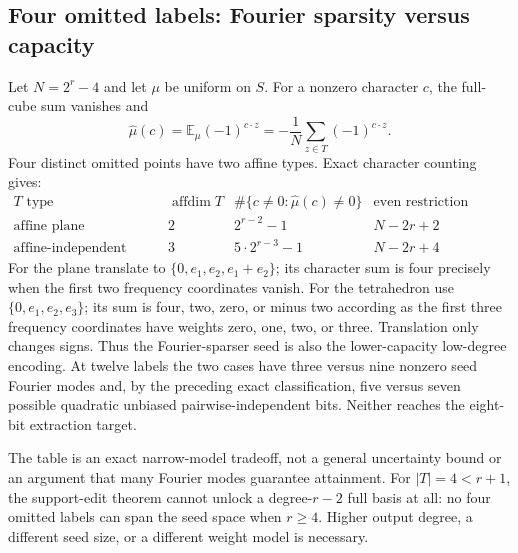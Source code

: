 \subsection{Four omitted labels: Fourier sparsity versus capacity}
Let $N=2^r-4$ and let $\mu$ be uniform on $S$. For a nonzero character
$c$, the full-cube sum vanishes and
\[
 \widehat\mu(c)=\mathbb E_\mu(-1)^{c\cdot z}
 =-\frac1N\sum_{z\in T}(-1)^{c\cdot z}.
\]
Four distinct omitted points have two affine types. Exact character
counting gives:
\[
 \begin{array}{c|c|c|c}
 T\text{ type}&\operatorname{affdim}T&
 \#\{c\ne0:\widehat\mu(c)\ne0\}&
 \text{even restriction bilinear rank}\\\hline
 \text{affine plane}&2&2^{r-2}-1&N-2r+2\\
 \text{affine-independent tetrahedron}&3&5\cdot2^{r-3}-1&N-2r+4
 \end{array}
\]
For the plane translate to $\{0,e_1,e_2,e_1+e_2\}$; its character sum
is four precisely when the first two frequency coordinates vanish.
For the tetrahedron use $\{0,e_1,e_2,e_3\}$; its sum is four, two,
zero, or minus two according as the first three frequency coordinates
have weights zero, one, two, or three. Translation only changes signs.
Thus the Fourier-sparser seed is also the lower-capacity low-degree
encoding. At twelve labels the two cases have three versus nine nonzero
seed Fourier modes and, by the preceding exact classification, five
versus seven possible quadratic unbiased pairwise-independent bits.
Neither reaches the eight-bit extraction target.

The table is an exact narrow-model tradeoff, not a general uncertainty
bound or an argument that many Fourier modes guarantee attainment.
For $|T|=4<r+1$, the support-edit theorem cannot unlock a degree-$r-2$
full basis at all: no four omitted labels can span the seed space when
$r\ge4$. Higher output degree, a different seed size, or a different
weight model is necessary.
